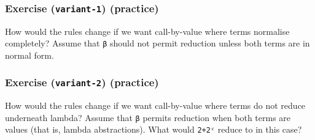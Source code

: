 \begin{fence}
\begin{code}
\AgdaSymbol{\}}\<%
\\
\>[.][@{}l@{}]\<[687I]%
\>[4]%
\>[698I]\AgdaSpace{}%
\AgdaSpace{}%
\<%
\\
\>[.][@{}l@{}]\<[698I]%
\>[6]\AgdaComment{-----------}\<%
\\
%
\>[4]\AgdaSpace{}%
\AgdaSpace{}%
\AgdaSpace{}%
\AgdaSpace{}%
\AgdaSpace{}%
\<%
\end{code}
\end{fence}

\hypertarget{exercise-variant-1-practice}{%
\subsubsection{\texorpdfstring{Exercise (\texttt{variant-1})
(practice)}{Exercise (variant-1) (practice)}}\label{exercise-variant-1-practice}}

How would the rules change if we want call-by-value where terms
normalise completely? Assume that \texttt{β} should not permit reduction
unless both terms are in normal form.

\begin{fence}
\begin{code}%
\>[0]\<%
\end{code}
\end{fence}

\hypertarget{exercise-variant-2-practice}{%
\subsubsection{\texorpdfstring{Exercise (\texttt{variant-2})
(practice)}{Exercise (variant-2) (practice)}}\label{exercise-variant-2-practice}}

How would the rules change if we want call-by-value where terms do not
reduce underneath lambda? Assume that \texttt{β} permits reduction when
both terms are values (that is, lambda abstractions). What would
\texttt{2+2ᶜ} reduce to in this case?

\begin{fence}
\begin{code}%
\>[0]\<%
\end{code}
\end{fence}

